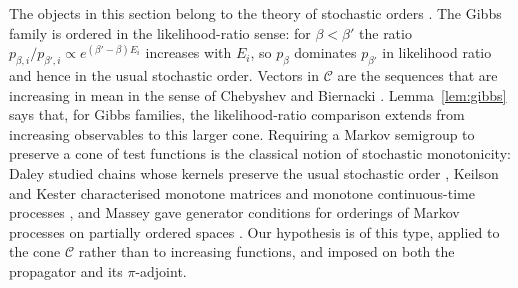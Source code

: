 \documentclass[11pt,a4paper]{article}
\theoremstyle{remark}\newtheorem{remark}[theorem]{Remark}
\newcommand{\C}{\mathcal C}
\begin{document}
The objects in this section belong to the theory of stochastic orders \cite{Shaked2007}. The Gibbs family is ordered in the likelihood-ratio sense: for $\beta<\beta'$ the ratio $p_{\beta,i}/p_{\beta',i}\propto e^{(\beta'-\beta)E_i}$ increases with $E_i$, so $p_\beta$ dominates $p_{\beta'}$ in likelihood ratio and hence in the usual stochastic order. Vectors in $\C$ are the sequences that are increasing in mean in the sense of Chebyshev and Biernacki \cite{Biernacki1951,Dragomir2004}. Lemma~\ref{lem:gibbs} says that, for Gibbs families, the likelihood-ratio comparison extends from increasing observables to this larger cone. Requiring a Markov semigroup to preserve a cone of test functions is the classical notion of stochastic monotonicity: Daley studied chains whose kernels preserve the usual stochastic order \cite{Daley1968}, Keilson and Kester characterised monotone matrices and monotone continuous-time processes \cite{KeilsonKester1977}, and Massey gave generator conditions for orderings of Markov processes on partially ordered spaces \cite{Massey1987}. Our hypothesis is of this type, applied to the cone $\C$ rather than to increasing functions, and imposed on both the propagator and its $\pi$-adjoint.
\end{document}
